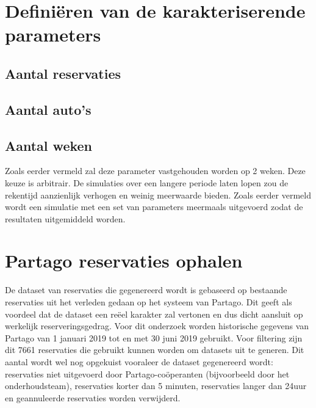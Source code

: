 \section{Definiëren van de karakteriserende parameters}
\subsection{Aantal reservaties}
\subsection{Aantal auto's}
\subsection{Aantal weken}
Zoals eerder vermeld zal deze parameter vastgehouden worden op 2 weken. Deze keuze is arbitrair. De simulaties over een langere periode laten lopen zou de rekentijd aanzienlijk verhogen en weinig meerwaarde bieden. Zoals eerder vermeld wordt een simulatie met een set van parameters meermaals uitgevoerd zodat de resultaten uitgemiddeld worden. 

\section{Partago reservaties ophalen}
De dataset van reservaties die gegenereerd wordt is gebaseerd op bestaande reservaties uit het verleden gedaan op het systeem van Partago. Dit geeft als voordeel dat de dataset een reëel karakter zal vertonen en dus dicht aansluit op werkelijk reserveringsgedrag. Voor dit onderzoek worden historische gegevens van Partago van 1 januari 2019 tot en met 30 juni 2019 gebruikt. Voor filtering zijn dit 7661 reservaties die gebruikt kunnen worden om datasets uit te generen. Dit aantal wordt wel nog opgekuist vooraleer de dataset gegenereerd wordt: reservaties niet uitgevoerd door Partago-coöperanten (bijvoorbeeld door het onderhoudsteam), reservaties korter dan 5 minuten, reservaties langer dan 24uur en geannuleerde reservaties worden verwijderd.

